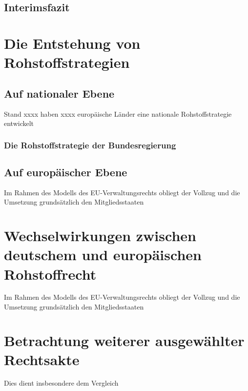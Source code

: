 \documentclass[12pt,a4paper,oneside]{book} %
\begin{document}
	\subsection{Interimsfazit}
	
	\section{Die Entstehung von Rohstoffstrategien}
	
	\subsection{Auf nationaler Ebene}
	Stand xxxx haben xxxx europäische Länder eine nationale Rohstoffstrategie entwickelt
	
	\subsubsection{Die Rohstoffstrategie der Bundesregierung}
	
	\subsection{Auf europäischer Ebene}
	
	Im Rahmen des Modells des EU-Verwaltungsrechts obliegt der Vollzug und die Umsetzung grundsätzlich den Mitgliedsstaaten
	
	\section{Wechselwirkungen zwischen deutschem und europäischen Rohstoffrecht}
		Im Rahmen des Modells des EU-Verwaltungsrechts obliegt der Vollzug und die Umsetzung grundsätzlich den Mitgliedsstaaten
		
	\section{Betrachtung weiterer ausgewählter Rechtsakte}
		
	Dies dient insbesondere dem Vergleich 
		
\end{document}

